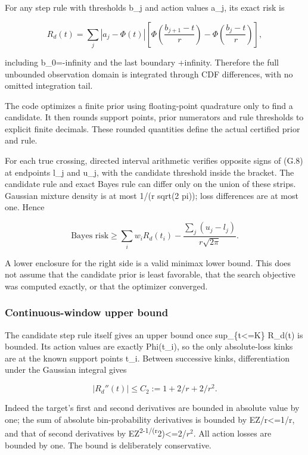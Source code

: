 For any step rule with thresholds b\_j and action values a\_j, its exact risk is

\[
R_d(t)=\sum_j |a_j-\Phi(t)|
\left[\Phi\left(\frac{b_{j+1}-t}{r}\right)
      -\Phi\left(\frac{b_j-t}{r}\right)\right],
\tag{G.9}
\]

including b\_0=-infinity and the last boundary +infinity. Therefore the full unbounded observation domain is integrated through CDF differences, with no omitted integration tail.

The code optimizes a finite prior using floating-point quadrature only to find a candidate. It then rounds support points, prior numerators and rule thresholds to explicit finite decimals. These rounded quantities define the actual certified prior and rule.

For each true crossing, directed interval arithmetic verifies opposite signs of (G.8) at endpoints l\_j and u\_j, with the candidate threshold inside the bracket. The candidate rule and exact Bayes rule can differ only on the union of these strips. Gaussian mixture density is at most 1/(r sqrt(2 pi)); loss differences are at most one. Hence

\[
\text{Bayes risk}\ge
\sum_i w_i R_d(t_i)-\frac{\sum_j(u_j-l_j)}{r\sqrt{2\pi}}.
\tag{G.10}
\]

A lower enclosure for the right side is a valid minimax lower bound. This does not assume that the candidate prior is least favorable, that the search objective was computed exactly, or that the optimizer converged.

\subsubsection{Continuous-window upper bound}\label{continuous-window-upper-bound}

The candidate step rule itself gives an upper bound once sup\_\{\textbar t\textbar\textless=K\} R\_d(t) is bounded. Its action values are exactly Phi(t\_i), so the only absolute-loss kinks are at the known support points t\_i. Between successive kinks, differentiation under the Gaussian integral gives

\[
|R_d''(t)|\le C_2:=1+2/r+2/r^2.
\tag{G.11}
\]

Indeed the target's first and second derivatives are bounded in absolute value by one; the sum of absolute bin-probability derivatives is bounded by E\textbar Z\textbar/r\textless=1/r, and that of second derivatives by E\textbar Z\textsuperscript{2-1\textbar/(r}2)\textless=2/\(r^2\). All action losses are bounded by one. The bound is deliberately conservative.

